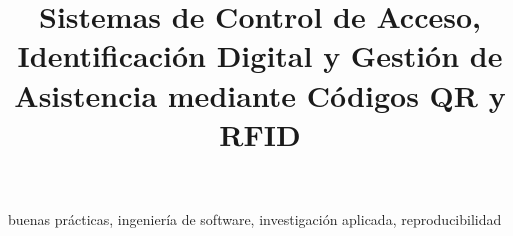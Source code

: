 \documentclass[conference]{IEEEtran}
\begin{document}
\title{Sistemas de Control de Acceso, Identificación Digital y Gestión de Asistencia mediante Códigos QR y RFID}

\author{
}

\maketitle

\begin{abstract}

\end{abstract}

\begin{IEEEkeywords}
buenas prácticas, ingeniería de software, investigación aplicada, reproducibilidad
\end{IEEEkeywords}










\printbibliography
\end{document}
